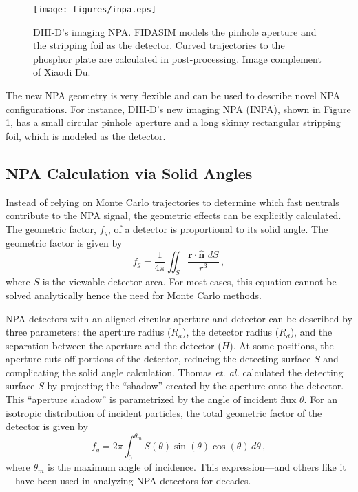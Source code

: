 \begin{figure}[h!]
    \centering
    \texttt{[image: figures/inpa.eps]}
    \caption{DIII-D's imaging NPA. FIDASIM models the pinhole aperture and the stripping foil as the detector. Curved trajectories to the phosphor plate are calculated in post-processing. Image complement of Xiaodi Du.}
    \label{fig:inpa}
\end{figure}
The new NPA geometry is very flexible and can be used to describe novel NPA configurations. For instance, DIII-D's new imaging NPA (INPA)\cite{du2018inpa}, shown in Figure \ref{fig:inpa}, has a small circular pinhole aperture and a long skinny rectangular stripping foil, which is modeled as the detector.\cite{du2018inpa}

\subsection{NPA Calculation via Solid Angles}
Instead of relying on Monte Carlo trajectories to determine which fast neutrals contribute to the NPA signal, the geometric effects can be explicitly calculated\cite{stagner2014geometric}.
The geometric factor, $f_g$, of a detector is proportional to its solid angle. The geometric factor is given by
\begin{equation}
\label{eq:solid_angle}
f_g = \frac{1}{4\pi} \iint_S \frac{\mathbf{r}\cdot\hat{\mathbf{n}}\,\,dS}{r^3}\,,
\end{equation} 
where $S$ is the viewable detector area. For most cases, this equation cannot be solved analytically hence the need for Monte Carlo methods.

NPA detectors with an aligned circular aperture and detector can be described by three parameters: the aperture radius ($R_a$), the detector radius ($R_d$), and the separation between the aperture and the detector ($H$). At some positions, the aperture cuts off portions of the detector, reducing the detecting surface $S$ and complicating the solid angle calculation. Thomas \emph{et. al.} \cite{thomas1972analytical} calculated the detecting surface $S$ by projecting the ``shadow'' created by the aperture onto the detector. This ``aperture shadow'' is parametrized by the angle of incident flux $\theta$. For an isotropic distribution of incident particles, the total geometric factor of the detector is given by
\begin{equation}
\label{eq:tot_gf}
f_g= 2\pi\int_0^{\theta_{m}}S(\theta)\sin(\theta)\cos(\theta)\,d\theta\,,
\end{equation}
where $\theta_{m}$ is the maximum angle of incidence. This expression---and others like it---have been used in analyzing NPA detectors for decades. 

